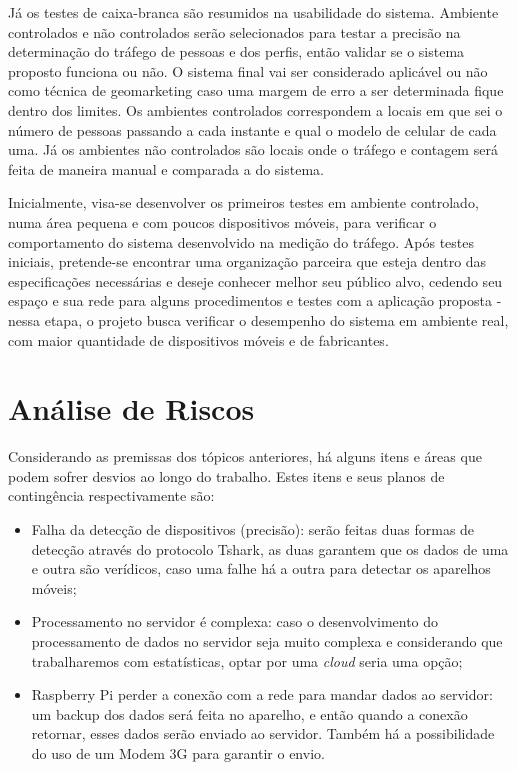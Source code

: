Já os testes de caixa-branca são resumidos na usabilidade do sistema. Ambiente controlados e não controlados serão selecionados
para testar a precisão na determinação do tráfego de pessoas e dos perfis, então validar se o sistema proposto funciona ou não.
O sistema final vai ser considerado aplicável ou não como técnica de geomarketing caso uma margem de erro a ser determinada fique dentro
dos limites. Os ambientes controlados correspondem a locais em que sei o número de pessoas passando a cada instante e qual o modelo de celular
de cada uma. Já os ambientes não controlados são locais onde o tráfego e contagem será feita de maneira manual e comparada a do sistema.

Inicialmente, visa-se desenvolver os primeiros testes em ambiente
controlado, numa área pequena e com poucos dispositivos móveis, para verificar o
comportamento do sistema desenvolvido na medição do tráfego. Após testes
iniciais, pretende-se encontrar uma organização parceira que esteja dentro das
especificações necessárias e deseje conhecer melhor seu público alvo, cedendo
seu espaço e sua rede para alguns procedimentos e testes com a aplicação proposta
 - nessa etapa, o projeto busca verificar o desempenho do
sistema em ambiente real, com maior quantidade de dispositivos móveis e de
fabricantes.

\section{Análise de Riscos}
Considerando as premissas dos tópicos anteriores, há alguns itens e áreas que podem sofrer desvios ao longo do trabalho. Estes itens e seus planos
de contingência respectivamente são:

\begin{itemize}
  \item Falha da detecção de dispositivos (precisão): serão feitas duas formas de detecção através do protocolo Tshark, as duas garantem que os dados
  de uma e outra são verídicos, caso uma falhe há a outra para detectar os aparelhos móveis;
  \item Processamento no servidor é complexa: caso o desenvolvimento do processamento de dados no servidor seja muito complexa e considerando
  que trabalharemos com estatísticas, optar por uma \emph{cloud} seria uma opção;
  \item Raspberry Pi perder a conexão com a rede para mandar dados ao servidor: um backup dos dados será feita no aparelho, e então quando
  a conexão retornar, esses dados serão enviado ao servidor. Também há a possibilidade do uso de um Modem 3G para garantir o envio.
\end{itemize}
